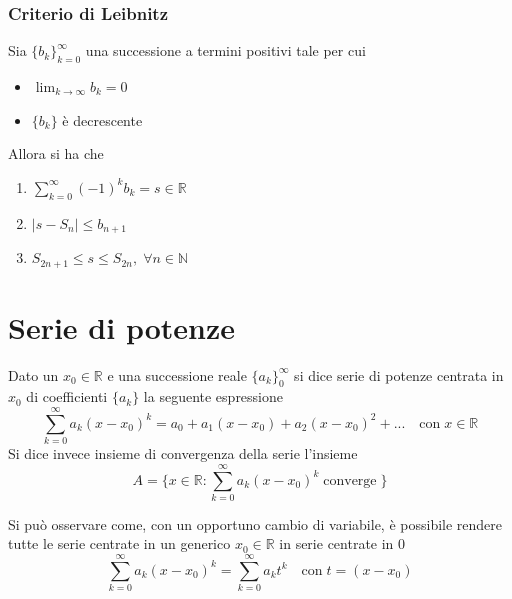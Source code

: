 \documentclass{article}
\begin{document}
            \vspace{10pt}
            \subsubsection{Criterio di Leibnitz}
                Sia $\{b_{k}\}_{k = 0}^{\infty}$ una successione a termini positivi tale per cui
                \begin{itemize}
                    \item $\displaystyle \lim_{k \rightarrow \infty} b_{k} = 0$
                    \item $\{b_{k}\}$ è decrescente
                \end{itemize}
                Allora si ha che
                \begin{enumerate}[label=(\arabic*)]
                    \item $\displaystyle \sum_{k = 0}^{\infty} (-1)^{k} b_{k} = s \in \mathbb{R}$
                    \item $|s - S_{n}| \leq b_{n + 1}$
                    \item $S_{2n + 1} \leq s \leq S_{2n}, \; \forall n \in \mathbb{N}$
                \end{enumerate}
                 



    \newpage
    \section{Serie di potenze}
        Dato un $x_{0} \in \mathbb{R}$ e una successione reale $\{a_{k}\}_{0}^{\infty}$ si dice serie di potenze centrata in $x_{0}$ di coefficienti $\{a_{k}\}$ la seguente espressione
        \[
            \sum_{k = 0}^{\infty} a_{k}(x - x_{0})^{k} = a_{0} + a_{1}(x - x_{0}) + a_{2}(x - x_{0})^{2} + ...  \quad \text{con} \; x \in \mathbb{R}
        \]
        Si dice invece insieme di convergenza della serie l'insieme
        \[
            A = \{ x \in \mathbb{R} : \sum_{k = 0}^{\infty} a_{k}(x - x_{0})^{k} \; \text{converge} \; \}
        \]

        \vspace{5pt}
        Si può osservare come, con un opportuno cambio di variabile, è possibile rendere tutte le serie centrate in un generico $x_{0} \in \mathbb{R}$ in serie centrate in $0$
        \[
            \sum_{k = 0}^{\infty} a_{k}(x - x_{0})^{k} = \sum_{k = 0}^{\infty} a_{k}t^{k} \quad \text{con} \; t = (x - x_{0})
        \]
    
\end{document}
